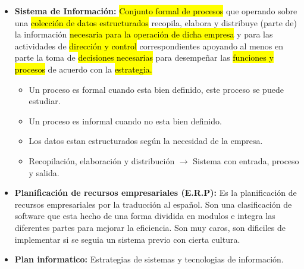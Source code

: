 \documentclass{templateNote}
\begin{document}
\begin{itemize}
    \item \textbf{Sistema de Información:} \hl{Conjunto formal de procesos} que operando sobre una \hl{colección de datos estructurados} recopila, elabora y distribuye (parte de) la información \hl{necesaria para la operación de dicha empresa} y para las actividades de \hl{dirección y control} correspondientes apoyando al menos en parte la toma de \hl{decisiones necesarias} para desempeñar las \hl{funciones y procesos} de acuerdo con la \hl{estrategia.}
    \begin{itemize}
        \item Un proceso es formal cuando esta bien definido, este proceso se puede estudiar.
        \item Un proceso es informal cuando no esta bien definido.
        \item Los datos estan estructurados según la necesidad de la empresa.
        \item Recopilación, elaboración y distribución $\rightarrow$ Sistema con entrada, proceso y salida.
    \end{itemize}

    \item \textbf{Planificación de recursos empresariales (E.R.P):} Es la planificación de recursos empresariales por la traducción al español. Son una clasificación de software que esta hecho de una forma dividida en modulos e integra las diferentes partes para mejorar la eficiencia. Son muy caros, son dificiles de implementar si se seguia un sistema previo con cierta cultura.

    \item \textbf{Plan informatico:} Estrategias de sistemas y tecnologias de información.
\end{itemize}
\end{document}
